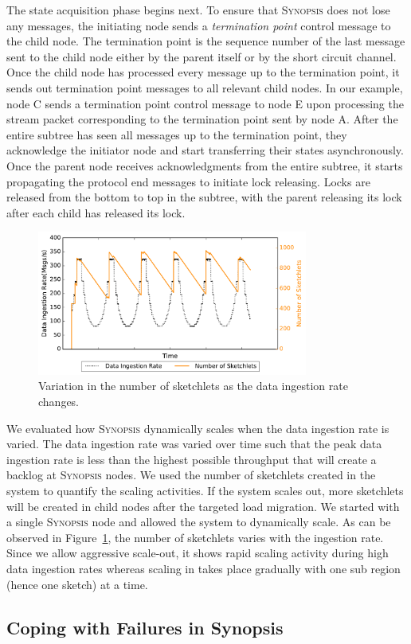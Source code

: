 The state acquisition phase begins next.
To ensure that \textsc{Synopsis} does not lose any messages, the initiating node sends a \emph{termination point} control message to the child node.
The termination point is the sequence number of the last message sent to the child node either by the parent itself or by the short circuit channel.
Once the child node has processed every message up to the termination point, it sends out termination point messages to all relevant child nodes. In our example, node C sends a termination point control message to node E upon processing the stream packet corresponding to the termination point sent by node A.
After the entire subtree has seen all messages up to the termination point, they acknowledge the initiator node and start transferring their states asynchronously.
Once the parent node receives acknowledgments from the entire subtree, it starts propagating the protocol end messages to initiate lock releasing.
Locks are released from the bottom to top in the subtree, with the parent releasing its lock after each child has released its lock.

\begin{figure}[h!]
    \centerline{\includegraphics[width=3.5in]{figures/dyn-scaling.pdf}}
    \caption{Variation in the number of sketchlets as the data ingestion rate changes.}
    \label{fig:dyn-scaling}
\end{figure}
We evaluated how \textsc{Synopsis} dynamically scales when the data ingestion rate is varied.
The data ingestion rate was varied over time such that the peak data ingestion rate is less than the highest possible throughput that will create a backlog at \textsc{Synopsis} nodes.
We used the number of sketchlets created in the system to quantify the scaling activities.
If the system scales out, more sketchlets will be created in child nodes after the targeted load migration.
We started with a single \textsc{Synopsis} node and allowed the system to dynamically scale.
As can be observed in Figure~\ref{fig:dyn-scaling}, the number of sketchlets varies with the ingestion rate.
Since we allow aggressive scale-out, it shows rapid scaling activity during high data ingestion rates whereas scaling in takes place gradually with one sub region (hence one sketch) at a time.



\subsection{Coping with Failures in Synopsis}


